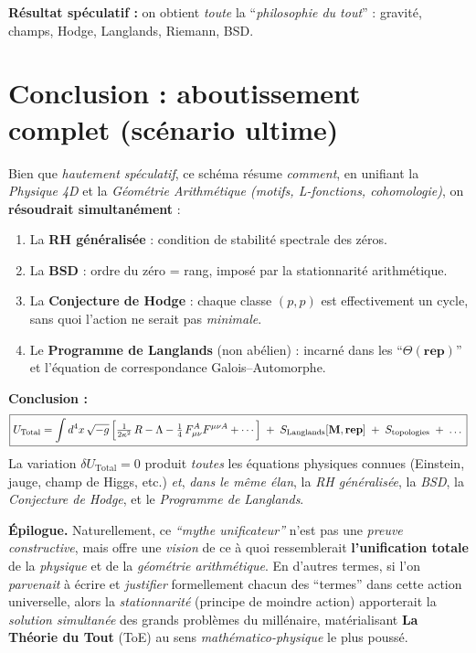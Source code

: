 \documentclass[11pt]{article}
\begin{document}
\noindent
\textbf{Résultat spéculatif :} on obtient \emph{toute} la “\emph{philosophie du tout}” : gravité, champs, Hodge, Langlands, Riemann, BSD. 

\section{Conclusion : aboutissement complet (scénario ultime)}
\label{sec:conclusion_ultime}

Bien que \emph{hautement spéculatif}, ce schéma résume \emph{comment}, en unifiant la \emph{Physique 4D} et la \emph{Géométrie Arithmétique (motifs, L-fonctions, cohomologie)}, on \textbf{résoudrait simultanément} :
\begin{enumerate}
  \item La \textbf{RH généralisée} : condition de stabilité spectrale des zéros.
  \item La \textbf{BSD} : ordre du zéro = rang, imposé par la stationnarité arithmétique.
  \item La \textbf{Conjecture de Hodge} : chaque classe \((p,p)\) est effectivement un cycle, sans quoi l'action ne serait pas \emph{minimale}.
  \item Le \textbf{Programme de Langlands} (non abélien) : incarné dans les “\(\Theta(\mathbf{rep})\)” et l'équation de correspondance Galois--Automorphe.
\end{enumerate}

\noindent
\textbf{Conclusion :} 
\[
\boxed{
U_{\mathrm{Total}} 
=
\int d^4x\,\sqrt{-g}\,\Bigl[
\tfrac{1}{2\kappa^2}\,R 
-\Lambda
-\tfrac14\,F_{\mu\nu}^A F^{\mu\nu A}
+\cdots
\Bigr]
\;+\;
S_{\mathrm{Langlands}}[\mathbf{M},\mathbf{rep}]
\;+\;
S_{\text{topologies}}
\;+\;\dots
}
\]
La variation \(\delta U_{\mathrm{Total}}=0\) produit \emph{toutes} les équations physiques connues (Einstein, jauge, champ de Higgs, etc.) \emph{et}, \emph{dans le même élan}, la \emph{RH généralisée}, la \emph{BSD}, la \emph{Conjecture de Hodge}, et le \emph{Programme de Langlands}. 

\bigskip
\noindent
\textbf{Épilogue.} 
Naturellement, ce \emph{“mythe unificateur”} n'est pas une \emph{preuve constructive}, mais offre une \emph{vision} de ce à quoi ressemblerait \textbf{l'unification totale} de la \emph{physique} et de la \emph{géométrie arithmétique}.  
En d'autres termes, si l'on \emph{parvenait} à écrire et \emph{justifier} formellement chacun des “termes” dans cette action universelle, alors la \emph{stationnarité} (principe de moindre action) apporterait la \emph{solution simultanée} des grands problèmes du millénaire, matérialisant \textbf{La Théorie du Tout} (ToE) au sens \emph{mathématico-physique} le plus poussé.
\end{document}
